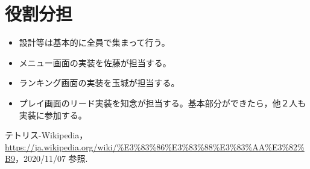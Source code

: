 \documentclass[a4paper,11pt]{jsarticle}
\begin{document}
\section{役割分担}
\begin{itemize}
  \item 設計等は基本的に全員で集まって行う。
  \item メニュー画面の実装を佐藤が担当する。
  \item ランキング画面の実装を玉城が担当する。
  \item プレイ画面のリード実装を知念が担当する。基本部分ができたら，他２人も実装に参加する。
\end{itemize}

\begin{thebibliography}{99}
   テトリス-Wikipedia，\url{https://ja.wikipedia.org/wiki/%E3%83%86%E3%83%88%E3%83%AA%E3%82%B9}，2020/11/07 参照.
\end{thebibliography}
\end{document}
